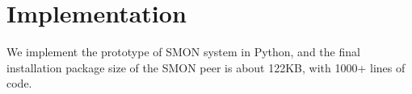 \section{Implementation}
\label{sec:impl}

We implement the prototype of SMON system in Python, and the
final installation package size of the SMON peer is about
122KB, with 1000+ lines of code.

%
%
%
%
%
%
%
%
%
%
%
%
%

